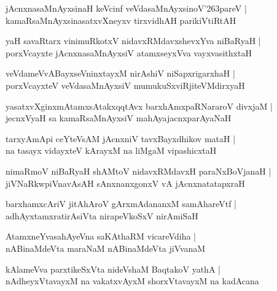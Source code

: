 \documentclass[twoside,12pt,openright]{book}
\def\S{\char'263}
\newcounter{shloka}[chapter]
\begin{document}
\begin{shloka}
jAcnxnasaMnAyxsinaH keVcinf veVdasaMnAyxsinoV\S pareV |\\
kamaRsaMnAyxsinasatxvXneyxv tirxvidhAH parikiVtiRtAH 
\end{shloka}

\begin{shloka}
yaH savaRtarx vinimuRkotxV nidavxRMdavxshevxYva niBaRyaH |\\
porxVcayxte jAcnxnasaMnAyxsiV atamxseyxVva vayxvasithxtaH 
\end{shloka}

\begin{shloka}
veVdameVvABayxseVninxtayxM nirAshiV niSapxrigarxhaH |\\
porxVcayxteV veVdasaMnAyxsiV mumukuSxviRjiteVMdirxyaH 
\end{shloka}

\begin{shloka}
yasatxvXginxmAtamxsAtakxqqtAvx barxhAmxpaRNararoV divxjaM |\\
jecnxVyaH sa kamaRsaMnAyxsiV mahAyajacnxparAyaNaH
\end{shloka}

\begin{shloka}
tarxyAmApi ceYteVsAM jAcnxniV tavxBayxdhikov mataH |\\
na tasayx vidayxteV kArayxM na liMgaM vipashicxtaH
\end{shloka}

\begin{shloka}
nimaRmoV niBaRyaH shAMtoV nidavxRMdavxH paraNxBoVjanaH |\\
jiVNaRkwpiVnavAsAH sAnxnanxgonxV vA jAcnxnatatapxraH 
\end{shloka}

\begin{shloka}
barxhamxcAriV jitAhAroV gArxmAdananxM samAhareVtf |\\
adhAyxtamxratirAsiVta nirapeVkoSxV nirAmiSaH 
\end{shloka}

\begin{shloka}
AtamxneYvasahAyeVna saKAthaRM vicareVdiha |\\
nABinaMdeVta maraNaM nABinaMdeVta jiVvanaM 
\end{shloka}

\begin{shloka}
kAlameVva parxtikeSxVta nideVshaM BaqtakoV yathA |\\
nAdheyxVtavayxM na vakatxvAyxM shorxVtavayxM na kadAcana 
\end{shloka}
\end{document}
